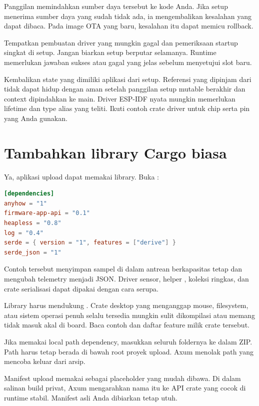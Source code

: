 Panggilan  memindahkan sumber daya tersebut ke kode Anda. Jika setup menerima sumber daya yang sudah tidak ada, ia mengembalikan kesalahan yang dapat dibaca. Pada image OTA yang baru, kesalahan itu dapat memicu rollback.

Tempatkan pembuatan driver yang mungkin gagal dan pemeriksaan startup singkat di setup. Jangan biarkan setup berputar selamanya. Runtime memerlukan jawaban sukses atau gagal yang jelas sebelum menyetujui slot baru.

\begin{warningbox}
Kembalikan state yang dimiliki aplikasi dari setup. Referensi yang dipinjam dari  tidak dapat hidup dengan aman setelah panggilan setup mutable berakhir dan context dipindahkan ke main. Driver ESP-IDF nyata mungkin memerlukan lifetime dan type alias yang teliti. Ikuti contoh crate driver untuk chip serta pin yang Anda gunakan.
\end{warningbox}

\section{Tambahkan library Cargo biasa}

Ya, aplikasi upload dapat memakai library. Buka :

\begin{lstlisting}[language=TOML,numbers=none]
[dependencies]
anyhow = "1"
firmware-app-api = "0.1"
heapless = "0.8"
log = "0.4"
serde = { version = "1", features = ["derive"] }
serde_json = "1"
\end{lstlisting}

Contoh tersebut menyimpan sampel di dalam antrean berkapasitas tetap dan mengubah telemetry menjadi JSON. Driver sensor, helper , koleksi ringkas, dan crate serialisasi dapat dipakai dengan cara serupa.

Library harus mendukung . Crate desktop yang menganggap mouse, filesystem, atau sistem operasi penuh selalu tersedia mungkin sulit dikompilasi atau memang tidak masuk akal di board. Baca contoh dan daftar feature milik crate tersebut.

Jika memakai local path dependency, masukkan seluruh foldernya ke dalam ZIP. Path harus tetap berada di bawah root proyek upload. Axum menolak path yang mencoba keluar dari arsip.

\begin{mentorbox}
Manifest upload memakai  sebagai placeholder yang mudah dibawa. Di dalam salinan build privat, Axum mengarahkan nama itu ke API crate yang cocok di runtime stabil. Manifest asli Anda dibiarkan tetap utuh.
\end{mentorbox}

